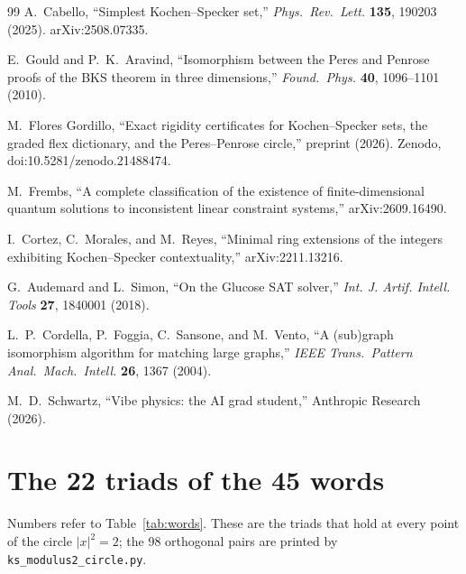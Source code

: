 \documentclass[11pt,a4paper]{article}
\theoremstyle{definition}
\theoremstyle{remark}
\begin{document}
\begin{thebibliography}{99}
A.~Cabello, ``Simplest Kochen--Specker set,''
\textit{Phys.\ Rev.\ Lett.} \textbf{135}, 190203 (2025).  arXiv:2508.07335.

E.~Gould and P.~K.~Aravind,
``Isomorphism between the Peres and Penrose proofs of the BKS theorem in three dimensions,''
\textit{Found.\ Phys.} \textbf{40}, 1096--1101 (2010).

M.~Flores Gordillo,
``Exact rigidity certificates for Kochen--Specker sets, the graded flex dictionary, and the
Peres--Penrose circle,'' preprint (2026).  Zenodo, doi:10.5281/zenodo.21488474.

M.~Frembs, ``A complete classification of the existence of finite-dimensional quantum solutions
to inconsistent linear constraint systems,'' arXiv:2609.16490.

I.~Cortez, C.~Morales, and M.~Reyes,
``Minimal ring extensions of the integers exhibiting Kochen--Specker contextuality,''
arXiv:2211.13216.

G.~Audemard and L.~Simon, ``On the Glucose SAT solver,''
\textit{Int. J. Artif. Intell. Tools} \textbf{27}, 1840001 (2018).

L.~P.~Cordella, P.~Foggia, C.~Sansone, and M.~Vento,
``A (sub)graph isomorphism algorithm for matching large graphs,''
\textit{IEEE Trans.\ Pattern Anal.\ Mach.\ Intell.} \textbf{26}, 1367 (2004).

M.~D.~Schwartz, ``Vibe physics: the AI grad student,'' Anthropic Research (2026).

\end{thebibliography}

\appendix



\section{The 22 triads of the 45 words}\label{app:triads}
Numbers refer to Table~\ref{tab:words}.  These are the triads that hold at every point of the
circle $|x|^2=2$; the 98 orthogonal pairs are printed by \texttt{ks\_modulus2\_circle.py}.

\smallskip\noindent\raggedright

\end{document}
